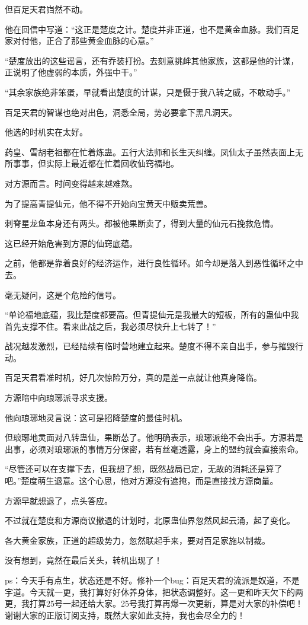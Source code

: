 \begin{this_body}
但百足天君岿然不动。

他在回信中写道：“这正是楚度之计。楚度并非正道，也不是黄金血脉。我们百足家对付他，正合了那些黄金血脉的心意。”

“楚度放出的这些谣言，还有乔装打扮。去刻意挑衅其他家族，这都是他的计谋，正说明了他虚弱的本质，外强中干。”

“其余家族绝非笨蛋，早就看出楚度的计谋，只是慑于我八转之威，不敢动手。”

百足天君的智谋也绝对出色，洞悉全局，势必要拿下黑凡洞天。

他选的时机实在太好。

药皇、雪胡老祖都在忙着炼蛊。五行大法师和长生天纠缠。凤仙太子虽然表面上无所事事，但实际上最近都在忙着回收仙窍福地。

对方源而言。时间变得越来越难熬。

为了提高青提仙元，他不得不开始向宝黄天中贩卖荒兽。

刺脊星龙鱼本身还有两头。都被他果断卖了，得到大量的仙元石挽救危情。

这已经开始危害到方源的仙窍底蕴。

之前，他都是靠着良好的经济运作，进行良性循环。如今却是落入到恶性循环之中去。

毫无疑问，这是个危险的信号。

“单论福地底蕴，我比楚度都要高。但青提仙元是我最大的短板，所有的蛊仙中我首先支撑不住。看来此战之后，我必须尽快升上七转了！”

战况越发激烈，已经陆续有临时营地建立起来。楚度不得不亲自出手，参与摧毁行动。

百足天君看准时机，好几次惊险万分，真的是差一点就让他真身降临。

方源暗中向琅琊派寻求支援。

他向琅琊地灵言说：这可是招降楚度的最佳时机。

但琅琊地灵面对八转蛊仙，果断怂了。他明确表示，琅琊派绝不会出手。方源若是出事，必须对琅琊派的事情万分保密，若有丝毫透露，身上的盟约就会直接索命。

“尽管还可以在支撑下去，但我想了想，既然战局已定，无故的消耗还是算了吧。”楚度萌生退意。这个心思，他对方源没有遮掩，而是直接找方源商量。

方源早就想退了，点头答应。

不过就在楚度和方源商议撤退的计划时，北原蛊仙界忽然风起云涌，起了变化。

各大黄金家族，正道的超级势力，忽然联起手来，要对百足家施以制裁。

没有想到，竟然在最后关头，转机出现了！

ps：今天手有点生，状态还是不好。修补一个bug：百足天君的流派是奴道，不是宇道。今天就一更，我打算好好休养身体，把状态调整好。这一更和昨天欠下的两更，我打算25号一起还给大家。25号我打算再爆一次更新，算是对大家的补偿吧！谢谢大家的正版订阅支持，既然大家如此支持，我也会尽全力的！

\end{this_body}

